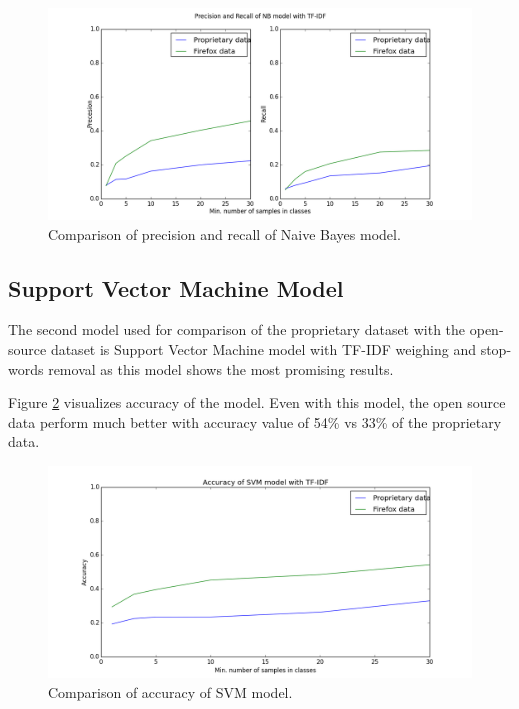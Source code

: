 \begin{figure}[htbp]
    \centering
        \includegraphics[width=\textwidth]{./images/prop_vs_os/nb_precision_and_recall.png}
    \caption{Comparison of precision and recall of Naive Bayes model.}
    \label{fig:results.datasets.nb_pr}
\end{figure}

\subsection{Support Vector Machine Model}

The second model used for comparison of the proprietary dataset with the open-source dataset is Support Vector Machine model with TF-IDF weighing and stop-words removal as this model shows the most promising results.

Figure \ref{fig:results.datasets.svm_accuracy} visualizes accuracy of the model. Even with this model, the open source data perform much better with accuracy value of 54\% vs 33\% of the proprietary data.

\begin{figure}[htbp]
    \centering
        \includegraphics[width=\textwidth]{./images/prop_vs_os/svm_accuracy.png}
    \caption{Comparison of accuracy of SVM model.}
    \label{fig:results.datasets.svm_accuracy}
\end{figure}

